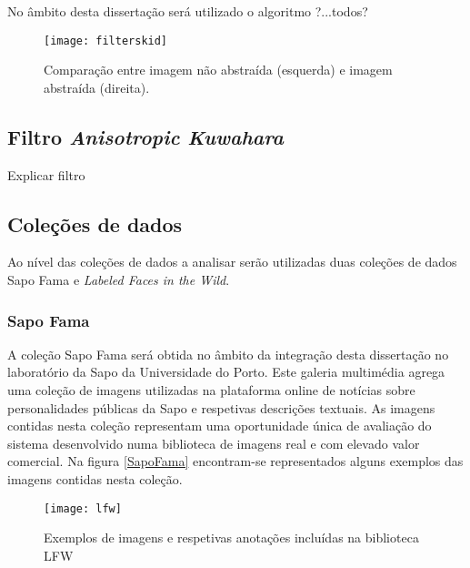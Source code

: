 No âmbito desta dissertação será utilizado o algoritmo ?...todos?

\begin{figure}[t]
  \begin{center}
    \leavevmode
    \texttt{[image: filterskid]}
    \caption{Comparação entre imagem não abstraída (esquerda) e imagem abstraída (direita).}	
    \label{fig:filterskid}
  \end{center}
\end{figure}

\subsection{	Filtro \textit{Anisotropic Kuwahara}}
Explicar filtro

\subsection{Coleções de dados}
Ao nível das coleções de dados a analisar serão utilizadas duas coleções de dados Sapo Fama e \textit{Labeled Faces in the Wild}.

\subsubsection{Sapo Fama}
A coleção Sapo Fama será obtida no âmbito da integração desta dissertação no laboratório da Sapo da Universidade do Porto. Este galeria multimédia agrega uma coleção de imagens utilizadas na plataforma online de notícias sobre personalidades públicas da Sapo e respetivas descrições textuais. As imagens contidas nesta coleção representam uma oportunidade única de avaliação do sistema desenvolvido numa biblioteca de imagens real e com elevado valor comercial. Na figura \ref{SapoFama} encontram-se representados alguns exemplos das imagens contidas nesta coleção. 

\begin{figure}[t]
  \begin{center}
    \leavevmode
    \texttt{[image: lfw]}
    \caption{Exemplos de imagens e respetivas anotações incluídas na biblioteca LFW}	
    \label{fig:lfwimagem}
  \end{center}
\end{figure}


